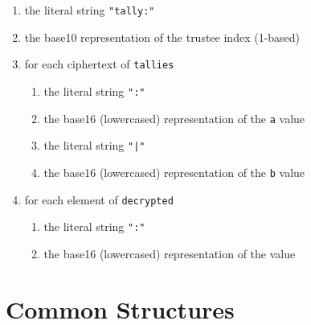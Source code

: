 \begin{enumerate}
    \item the literal string \lstinline[style=ES6]{"tally:"}
    \item the base10 representation of the trustee index (1-based)
    \item for each ciphertext of \texttt{tallies}
          \begin{enumerate}
              \item the literal string \lstinline[style=ES6]{":"}
              \item the base16 (lowercased) representation of the \texttt{a} value
              \item the literal string \lstinline[style=ES6]{"|"}
              \item the base16 (lowercased) representation of the \texttt{b} value
          \end{enumerate}
    \item for each element of \texttt{decrypted}
          \begin{enumerate}
              \item the literal string \lstinline[style=ES6]{":"}
              \item the base16 (lowercased) representation of the value
          \end{enumerate}
\end{enumerate}

\newpage %
\section*{Common Structures}

